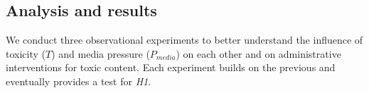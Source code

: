\subsection{Analysis and results}\label{sec:relationship:results}

We conduct three observational
experiments to better understand the influence of toxicity ($T$) and media
pressure ($P_{media}$) on each other and on administrative interventions for
toxic content. Each experiment builds on the previous and eventually provides
a test for \emph{H1}. 
% 
% 
% 
